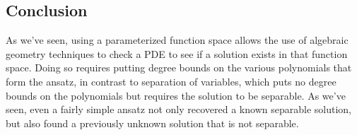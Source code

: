 \documentclass{article}
\begin{document}

\subsection*{Conclusion}

As we've seen, using a parameterized function space allows the use of algebraic geometry
techniques to check a PDE to see if a solution exists in that function space.
Doing so requires putting degree bounds on the various polynomials that form
the ansatz, in contrast to separation of variables, which puts no degree bounds
on the polynomials but requires the solution to be separable.  As we've seen,
even a fairly simple ansatz not only recovered a known separable solution,
but also found a previously unknown solution that is not separable.
\end{document}
